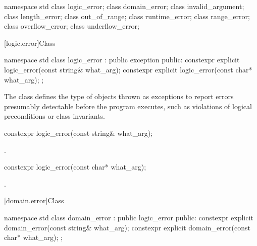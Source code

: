 %
%
%
%
%
%
%
%
%
\begin{codeblock}
namespace std {
  class logic_error;
    class domain_error;
    class invalid_argument;
    class length_error;
    class out_of_range;
  class runtime_error;
    class range_error;
    class overflow_error;
    class underflow_error;
}
\end{codeblock}

[logic.error]{Class }

%
\begin{codeblock}
namespace std {
  class logic_error : public exception {
  public:
    constexpr explicit logic_error(const string& what_arg);
    constexpr explicit logic_error(const char* what_arg);
  };
}
\end{codeblock}

\pnum
The class
defines the type of objects thrown as
exceptions to report errors presumably detectable before
the program executes, such as violations of logical preconditions or class
invariants.

%
\begin{itemdecl}
constexpr logic_error(const string& what_arg);
\end{itemdecl}

\begin{itemdescr}
\pnum
\ensures
{}.
\end{itemdescr}

%
\begin{itemdecl}
constexpr logic_error(const char* what_arg);
\end{itemdecl}

\begin{itemdescr}
\pnum
\ensures
{}.
\end{itemdescr}

[domain.error]{Class }

%
\begin{codeblock}
namespace std {
  class domain_error : public logic_error {
  public:
    constexpr explicit domain_error(const string& what_arg);
    constexpr explicit domain_error(const char* what_arg);
  };
}
\end{codeblock}

